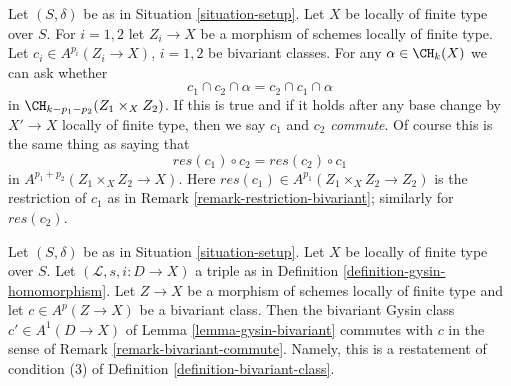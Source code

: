\begin{remark}
\label{remark-bivariant-commute}
Let $(S, \delta)$ be as in Situation \ref{situation-setup}. Let $X$ be
locally of finite type over $S$. For $i = 1, 2$ let $Z_i \to X$
be a morphism of schemes locally of finite type. Let
$c_i \in A^{p_i}(Z_i \to X)$, $i = 1, 2$ be bivariant classes.
For any $\alpha \in \CH_k(X)$ we can ask whether
$$
c_1 \cap c_2 \cap \alpha = c_2 \cap c_1 \cap \alpha
$$
in $\CH_{k - p_1 - p_2}(Z_1 \times_X Z_2)$. If this is true and if it holds
after any base change by $X' \to X$ locally of finite type, then we say
$c_1$ and $c_2$ {\it commute}. Of course this is the same thing as saying that
$$
res(c_1) \circ c_2 = res(c_2) \circ c_1
$$
in $A^{p_1 + p_2}(Z_1 \times_X Z_2 \to X)$. Here
$res(c_1) \in A^{p_1}(Z_1 \times_X Z_2 \to Z_2)$ is the restriction of $c_1$
as in Remark \ref{remark-restriction-bivariant}; similarly for $res(c_2)$.
\end{remark}

\begin{example}
\label{example-gysin-commute}
Let $(S, \delta)$ be as in Situation \ref{situation-setup}. Let $X$ be locally
of finite type over $S$. Let $(\mathcal{L}, s, i : D \to X)$ a triple as in
Definition \ref{definition-gysin-homomorphism}. Let $Z \to X$ be a morphism
of schemes locally of finite type and let $c \in A^p(Z \to X)$ be a
bivariant class. Then the bivariant Gysin class $c' \in A^1(D \to X)$ of
Lemma \ref{lemma-gysin-bivariant} commutes with $c$ in the sense of
Remark \ref{remark-bivariant-commute}. Namely, this is a restatement of
condition (3) of Definition \ref{definition-bivariant-class}.
\end{example}

